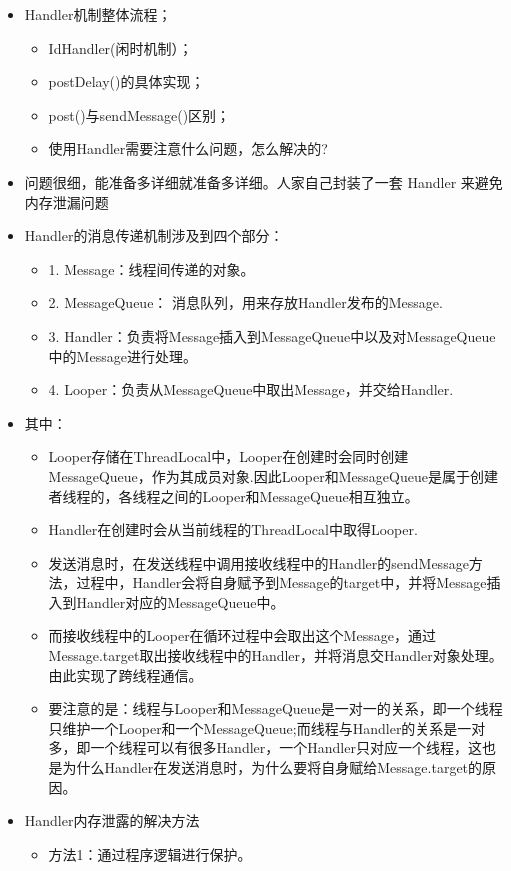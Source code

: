 \documentclass[9pt, b5paper]{article}
\begin{document}
\begin{itemize}
\item Handler机制整体流程；
\begin{itemize}
\item IdHandler(闲时机制）；
\item postDelay()的具体实现；
\item post()与sendMessage()区别；
\item 使用Handler需要注意什么问题，怎么解决的?
\end{itemize}
\item 问题很细，能准备多详细就准备多详细。人家自己封装了一套 Handler 来避免内存泄漏问题
\item Handler的消息传递机制涉及到四个部分：
\begin{itemize}
\item 1. Message：线程间传递的对象。
\item 2. MessageQueue： 消息队列，用来存放Handler发布的Message.
\item 3. Handler：负责将Message插入到MessageQueue中以及对MessageQueue中的Message进行处理。
\item 4. Looper：负责从MessageQueue中取出Message，并交给Handler.
\end{itemize}
\item 其中：
\begin{itemize}
\item Looper存储在ThreadLocal中，Looper在创建时会同时创建MessageQueue，作为其成员对象.因此Looper和MessageQueue是属于创建者线程的，各线程之间的Looper和MessageQueue相互独立。
\item Handler在创建时会从当前线程的ThreadLocal中取得Looper.
\item 发送消息时，在发送线程中调用接收线程中的Handler的sendMessage方法，过程中，Handler会将自身赋予到Message的target中，并将Message插入到Handler对应的MessageQueue中。
\item 而接收线程中的Looper在循环过程中会取出这个Message，通过Message.target取出接收线程中的Handler，并将消息交Handler对象处理。由此实现了跨线程通信。
\item 要注意的是：线程与Looper和MessageQueue是一对一的关系，即一个线程只维护一个Looper和一个MessageQueue;而线程与Handler的关系是一对多，即一个线程可以有很多Handler，一个Handler只对应一个线程，这也是为什么Handler在发送消息时，为什么要将自身赋给Message.target的原因。
\end{itemize}
\item Handler内存泄露的解决方法
\begin{itemize}
\item 方法1：通过程序逻辑进行保护。

\end{itemize}
\end{itemize}
\end{document}
